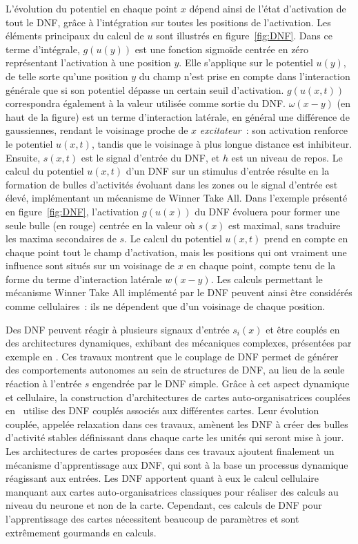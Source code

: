 \documentclass[../main]{subfiles}
\begin{document}
L'évolution du potentiel en chaque point $x$ dépend ainsi de l'état d'activation de tout le DNF, grâce à l'intégration sur toutes les positions de l'activation. Les éléments principaux du calcul de $u$ sont illustrés en figure~\ref{fig:DNF}.
Dans ce terme d'intégrale, $g(u(y))$ est une fonction sigmoïde centrée en zéro représentant l'activation à une position $y$. Elle s'applique sur le potentiel $u(y)$, de telle sorte qu'une position $y$ du champ n'est prise en compte dans l'interaction générale que si son potentiel dépasse un certain seuil d'activation. $g(u(x,t))$ correspondra également à la valeur utilisée comme sortie du DNF.
$\omega(x-y)$ (en haut de la figure) est un terme d'interaction latérale, en général une différence de gaussiennes, rendant le voisinage proche de $x$ \emph{excitateur}~: son activation renforce le potentiel $u(x,t)$, tandis que le voisinage à plus longue distance est inhibiteur. 
Ensuite, $s(x,t)$ est le signal d'entrée du DNF, et $h$ est un niveau de repos.
Le calcul du potentiel $u(x,t)$ d'un DNF sur un stimulus d'entrée résulte en la formation de bulles d'activités évoluant dans les zones ou le signal d'entrée est élevé, implémentant un mécanisme de Winner Take All. Dans l'exemple présenté en figure~\ref{fig:DNF}, l'activation $g(u(x))$ du DNF évoluera pour former une seule bulle (en rouge) centrée en la valeur où $s(x)$ est maximal, sans traduire les maxima secondaires de $s$.
Le calcul du potentiel $u(x,t)$ prend en compte en chaque point tout le champ d'activation, mais les positions qui ont vraiment une influence sont situés sur un voisinage de $x$ en chaque point, compte tenu de la forme du terme d'interaction latérale $w(x-y)$.
Les calculs permettant le mécanisme Winner Take All implémenté par le DNF peuvent ainsi être considérés comme cellulaires~: ils ne dépendent que d'un voisinage de chaque position.

Des DNF peuvent réagir à plusieurs signaux d'entrée $s_i(x)$ et être couplés en des architectures dynamiques, exhibant des mécaniques complexes, présentées par exemple en \cite{Fix2011ADN, Sandamirskaya2014DynamicNF}.
Ces travaux montrent que le couplage de DNF permet de générer des comportements autonomes au sein de structures de DNF, au lieu de la seule réaction à l'entrée $s$ engendrée par le DNF simple.
Grâce à cet aspect dynamique et cellulaire, la construction d'architectures de cartes auto-organisatrices couplées en~\cite{khouzam_neural_2014,menard05} utilise des DNF couplés associés aux différentes cartes. Leur évolution couplée, appelée relaxation dans ces travaux, amènent les DNF à créer des bulles d'activité stables définissant dans chaque carte les unités qui seront mise à jour.
Les architectures de cartes proposées dans ces travaux ajoutent finalement un mécanisme d'apprentissage aux DNF, qui sont à la base un processus dynamique réagissant aux entrées.
Les DNF apportent quant à eux le calcul cellulaire manquant aux cartes auto-organisatrices classiques pour réaliser des calculs au niveau du neurone et non de la carte.
Cependant, ces calculs de DNF pour l'apprentissage des cartes nécessitent beaucoup de paramètres et sont extrêmement gourmands en calculs.
\end{document}
